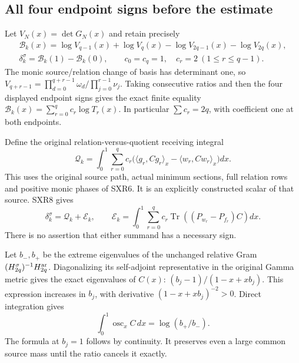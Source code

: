 \subsection{All four endpoint signs before the estimate}

Let $V_N(x)=\det G_N(x)$ and retain precisely
\begin{equation}\tag{SXR10}
\begin{gathered}
 \mathcal B_k(x)=\log V_{q-1}(x)+\log V_q(x)
                     -\log V_{2q-1}(x)-\log V_{2q}(x),\\
 \delta_k^\sigma=\mathcal B_k(1)-\mathcal B_k(0),\qquad
 c_0=c_q=1,\quad c_r=2\ (1\le r\le q-1).
\end{gathered}
\end{equation}
The monic source/relation change of basis has determinant one, so
$V_{q+r-1}=\prod_{d=0}^{q+r-1}\omega_d/\prod_{j=0}^{r-1}\nu_j$.
Taking consecutive ratios and then the four displayed endpoint signs
gives the exact finite equality
$\mathcal B_k(x)=\sum_{r=0}^q c_r\log T_r(x)$.
In particular $\sum c_r=2q$, with coefficient one at both endpoints.

Define the original relation-versus-quotient receiving integral
\begin{equation}\tag{SXR11}
 \mathcal Q_k=\int_0^1\sum_{r=0}^q c_r
  \bigl(\langle g_r,Cg_r\rangle_x
                  -\langle w_r,Cw_r\rangle_x\bigr)dx.
\end{equation}
This uses the original source path, actual minimum sections, full
relation rows and positive monic phases of SXR6. It is an explicitly
constructed scalar of that source. SXR8 gives
\begin{equation}\tag{SXR12}
 \delta_k^\sigma=\mathcal Q_k+\mathcal E_k,\qquad
 \mathcal E_k=\int_0^1\sum_{r=0}^q c_r
          \operatorname{Tr}((P_{w_r}-P_{f_r})C)dx.
\end{equation}
There is no assertion that either summand has a necessary sign.

Let $b_-,b_+$ be the extreme eigenvalues of the unchanged relative
Gram $(H_{2q}^\sigma)^{-1}H_{2q}^{\rm ar}$. Diagonalizing its
self-adjoint representative in the original Gamma metric gives
the exact eigenvalues of $C(x)$:
$(b_j-1)/(1-x+xb_j)$. This expression increases in $b_j$,
with derivative $(1-x+xb_j)^{-2}>0$. Direct integration gives
\begin{equation}\tag{SXR13}
 \int_0^1\operatorname{osc}_x C\,dx
       =\log(b_+/b_-).
\end{equation}
The formula at $b_j=1$ follows by continuity. It preserves even a
large common source mass until the ratio cancels it exactly.

